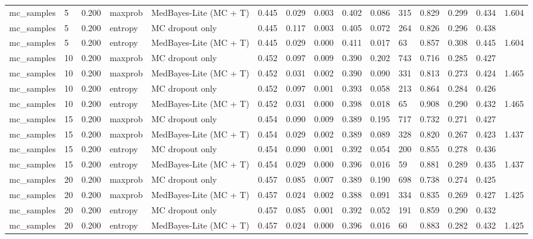 \begin{table}[htbp]
\begin{tabular}{lllllllllllllll}
mc\_samples & 5 & 0.200 & maxprob & MedBayes-Lite (MC + T) & 0.445 & 0.029 & 0.003 & 0.402 & 0.086 & 315 & 0.829 & 0.299 & 0.434 & 1.604 \\
mc\_samples & 5 & 0.200 & entropy & MC dropout only & 0.445 & 0.117 & 0.003 & 0.405 & 0.072 & 264 & 0.826 & 0.296 & 0.438 &  \\
mc\_samples & 5 & 0.200 & entropy & MedBayes-Lite (MC + T) & 0.445 & 0.029 & 0.000 & 0.411 & 0.017 & 63 & 0.857 & 0.308 & 0.445 & 1.604 \\
mc\_samples & 10 & 0.200 & maxprob & MC dropout only & 0.452 & 0.097 & 0.009 & 0.390 & 0.202 & 743 & 0.716 & 0.285 & 0.427 &  \\
mc\_samples & 10 & 0.200 & maxprob & MedBayes-Lite (MC + T) & 0.452 & 0.031 & 0.002 & 0.390 & 0.090 & 331 & 0.813 & 0.273 & 0.424 & 1.465 \\
mc\_samples & 10 & 0.200 & entropy & MC dropout only & 0.452 & 0.097 & 0.001 & 0.393 & 0.058 & 213 & 0.864 & 0.284 & 0.426 &  \\
mc\_samples & 10 & 0.200 & entropy & MedBayes-Lite (MC + T) & 0.452 & 0.031 & 0.000 & 0.398 & 0.018 & 65 & 0.908 & 0.290 & 0.432 & 1.465 \\
mc\_samples & 15 & 0.200 & maxprob & MC dropout only & 0.454 & 0.090 & 0.009 & 0.389 & 0.195 & 717 & 0.732 & 0.271 & 0.427 &  \\
mc\_samples & 15 & 0.200 & maxprob & MedBayes-Lite (MC + T) & 0.454 & 0.029 & 0.002 & 0.389 & 0.089 & 328 & 0.820 & 0.267 & 0.423 & 1.437 \\
mc\_samples & 15 & 0.200 & entropy & MC dropout only & 0.454 & 0.090 & 0.001 & 0.392 & 0.054 & 200 & 0.855 & 0.278 & 0.436 &  \\
mc\_samples & 15 & 0.200 & entropy & MedBayes-Lite (MC + T) & 0.454 & 0.029 & 0.000 & 0.396 & 0.016 & 59 & 0.881 & 0.289 & 0.435 & 1.437 \\
mc\_samples & 20 & 0.200 & maxprob & MC dropout only & 0.457 & 0.085 & 0.007 & 0.389 & 0.190 & 698 & 0.738 & 0.274 & 0.425 &  \\
mc\_samples & 20 & 0.200 & maxprob & MedBayes-Lite (MC + T) & 0.457 & 0.024 & 0.002 & 0.388 & 0.091 & 334 & 0.835 & 0.269 & 0.427 & 1.425 \\
mc\_samples & 20 & 0.200 & entropy & MC dropout only & 0.457 & 0.085 & 0.001 & 0.392 & 0.052 & 191 & 0.859 & 0.290 & 0.432 &  \\
mc\_samples & 20 & 0.200 & entropy & MedBayes-Lite (MC + T) & 0.457 & 0.024 & 0.000 & 0.396 & 0.016 & 60 & 0.883 & 0.282 & 0.432 & 1.425 \\

\end{tabular}
\end{table}
